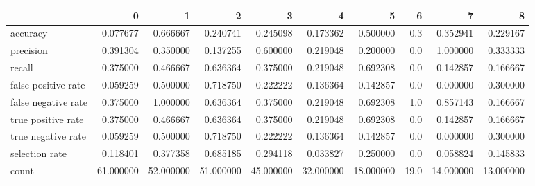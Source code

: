 \begin{tabular}{lrrrrrrrrr}
\toprule
{} &          0 &          1 &          2 &          3 &          4 &          5 &     6 &          7 &          8 \\
\midrule
accuracy            &   0.077677 &   0.666667 &   0.240741 &   0.245098 &   0.173362 &   0.500000 &   0.3 &   0.352941 &   0.229167 \\
precision           &   0.391304 &   0.350000 &   0.137255 &   0.600000 &   0.219048 &   0.200000 &   0.0 &   1.000000 &   0.333333 \\
recall              &   0.375000 &   0.466667 &   0.636364 &   0.375000 &   0.219048 &   0.692308 &   0.0 &   0.142857 &   0.166667 \\
false positive rate &   0.059259 &   0.500000 &   0.718750 &   0.222222 &   0.136364 &   0.142857 &   0.0 &   0.000000 &   0.300000 \\
false negative rate &   0.375000 &   1.000000 &   0.636364 &   0.375000 &   0.219048 &   0.692308 &   1.0 &   0.857143 &   0.166667 \\
true positive rate  &   0.375000 &   0.466667 &   0.636364 &   0.375000 &   0.219048 &   0.692308 &   0.0 &   0.142857 &   0.166667 \\
true negative rate  &   0.059259 &   0.500000 &   0.718750 &   0.222222 &   0.136364 &   0.142857 &   0.0 &   0.000000 &   0.300000 \\
selection rate      &   0.118401 &   0.377358 &   0.685185 &   0.294118 &   0.033827 &   0.250000 &   0.0 &   0.058824 &   0.145833 \\
count               &  61.000000 &  52.000000 &  51.000000 &  45.000000 &  32.000000 &  18.000000 &  19.0 &  14.000000 &  13.000000 \\
\bottomrule
\end{tabular}
